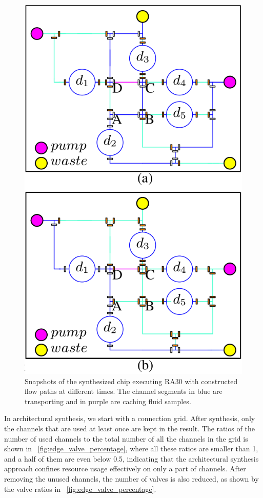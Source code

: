 \begin{figure}[t]
    \centering
    \includegraphics[width=0.7\linewidth]{Visio/RA30_exe_flow_test_ver3.png}
  \caption{Snapshots of the synthesized chip executing RA30 with constructed flow paths at different times. The channel segments in blue are transporting and in purple are caching fluid samples.}
      \label{fig:RA30_exe_2}
\end{figure}

In architectural synthesis, we start with a connection grid. After synthesis, only the channels that are used at least once are kept in the result. The ratios of the number of used channels to the total number of all the channels in the grid is shown in \figname~\ref{fig:edge_valve_percentage}, where all these ratios are smaller than 1, and a half of them are even below 0.5, indicating that the architectural synthesis approach confines resource usage effectively on only a part of channels.  After removing the unused channels, the number of valves is also reduced, as shown by the valve ratios in \figname~\ref{fig:edge_valve_percentage}.

